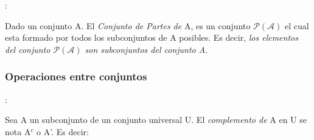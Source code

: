 \documentclass[10pt]{article}
\begin{document}
\begin{defi}:

Dado un conjunto A. El \textit{Conjunto de Partes de} A, es un conjunto $\mathcal{P(A)}$ el cual esta formado por todos los subconjuntos de A posibles. Es decir, \textit{los elementos del conjunto $\mathcal{P(A)}$ son subconjuntos del conjunto A}.
\end{defi}

\begin{center}
 \subsubsection{Operaciones entre conjuntos}
\end{center}

\begin{defi}[Complemento]:
 
Sea A un subconjunto de un conjunto universal U. El \textit{complemento de} A en U se nota A$^c$ o A'.
Es decir:

\begin{center}
\end{center}
\end{defi}
\end{document}
